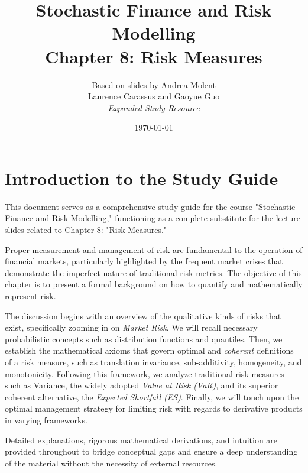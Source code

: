 \documentclass[12pt, a4paper]{report}
\title{\textbf{Stochastic Finance and Risk Modelling} \\ \large Chapter 8: Risk Measures}
\author{Based on slides by Andrea Molent \\ Laurence Carassus and Gaoyue Guo \\ \textit{Expanded Study Resource}}
\date{\today}
\theoremstyle{definition}
\begin{document}
\maketitle

\tableofcontents

\chapter*{Introduction to the Study Guide}
This document serves as a comprehensive study guide for the course "Stochastic Finance and Risk Modelling," functioning as a complete substitute for the lecture slides related to Chapter 8: "Risk Measures."

Proper measurement and management of risk are fundamental to the operation of financial markets, particularly highlighted by the frequent market crises that demonstrate the imperfect nature of traditional risk metrics. The objective of this chapter is to present a formal background on how to quantify and mathematically represent risk.

The discussion begins with an overview of the qualitative kinds of risks that exist, specifically zooming in on \textit{Market Risk}. We will recall necessary probabilistic concepts such as distribution functions and quantiles. Then, we establish the mathematical axioms that govern optimal and \textit{coherent} definitions of a risk measure, such as translation invariance, sub-additivity, homogeneity, and monotonicity. Following this framework, we analyze traditional risk measures such as Variance, the widely adopted \textit{Value at Risk (VaR)}, and its superior coherent alternative, the \textit{Expected Shortfall (ES)}. Finally, we will touch upon the optimal management strategy for limiting risk with regards to derivative products in varying frameworks.

Detailed explanations, rigorous mathematical derivations, and intuition are provided throughout to bridge conceptual gaps and ensure a deep understanding of the material without the necessity of external resources.







\end{document}
